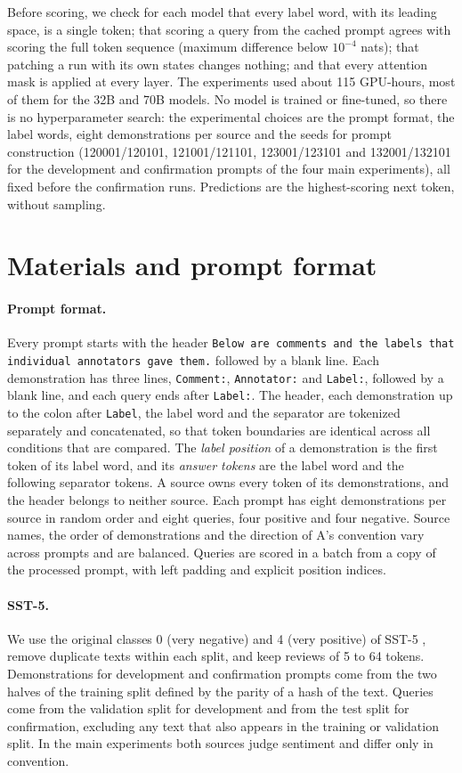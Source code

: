 Before scoring, we check for each model that every label word, with its leading space, is a single token; that scoring a query from the cached prompt agrees with scoring the full token sequence (maximum difference below $10^{-4}$ nats); that patching a run with its own states changes nothing; and that every attention mask is applied at every layer.
The experiments used about 115 GPU-hours, most of them for the 32B and 70B models.
No model is trained or fine-tuned, so there is no hyperparameter search: the experimental choices are the prompt format, the label words, eight demonstrations per source and the seeds for prompt construction (120001/120101, 121001/121101, 123001/123101 and 132001/132101 for the development and confirmation prompts of the four main experiments), all fixed before the confirmation runs. Predictions are the highest-scoring next token, without sampling.

\section{Materials and prompt format}
\label{app:materials}

\paragraph{Prompt format.}
Every prompt starts with the header \texttt{Below are comments and the labels that individual annotators gave them.} followed by a blank line.
Each demonstration has three lines, \texttt{Comment:}, \texttt{Annotator:} and \texttt{Label:}, followed by a blank line, and each query ends after \texttt{Label:}.
The header, each demonstration up to the colon after \texttt{Label}, the label word and the separator are tokenized separately and concatenated, so that token boundaries are identical across all conditions that are compared.
The \emph{label position} of a demonstration is the first token of its label word, and its \emph{answer tokens} are the label word and the following separator tokens.
A source owns every token of its demonstrations, and the header belongs to neither source.
Each prompt has eight demonstrations per source in random order and eight queries, four positive and four negative.
Source names, the order of demonstrations and the direction of A's convention vary across prompts and are balanced.
Queries are scored in a batch from a copy of the processed prompt, with left padding and explicit position indices.

\paragraph{SST-5.}
We use the original classes 0 (very negative) and 4 (very positive) of SST-5 \citep{socher-etal-2013-recursive}, remove duplicate texts within each split, and keep reviews of 5 to 64 tokens.
Demonstrations for development and confirmation prompts come from the two halves of the training split defined by the parity of a hash of the text.
Queries come from the validation split for development and from the test split for confirmation, excluding any text that also appears in the training or validation split.
In the main experiments both sources judge sentiment and differ only in convention.

